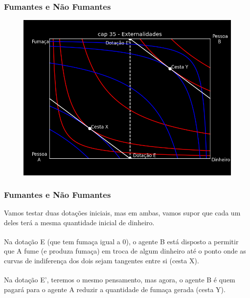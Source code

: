 \documentclass{beamer}[10]
\begin{document}
\begin{frame}
	\frametitle{Fumantes e Não Fumantes}

	\begin{figure}[H]
		\centering
		\includegraphics[scale=0.6]{cap35_1-dinheiro_fumaca.png}
	\end{figure}

\end{frame}

\begin{frame}
	\frametitle{Fumantes e Não Fumantes}

	Vamos testar duas dotações iniciais, mas em ambas, vamos supor que cada um deles terá a mesma quantidade inicial de dinheiro.
	\\~\\
	Na dotação E (que tem fumaça igual a 0), o agente B está disposto a permitir que A fume (e produza fumaça) em troca de algum dinheiro até o ponto onde as curvas de indiferença dos dois sejam tangentes entre si (cesta X).
	\\~\\
	Na dotação E', teremos o mesmo pensamento, mas agora, o agente B é quem pagará para o agente A reduzir a quantidade de fumaça gerada (cesta Y).

\end{frame}
\end{document}

